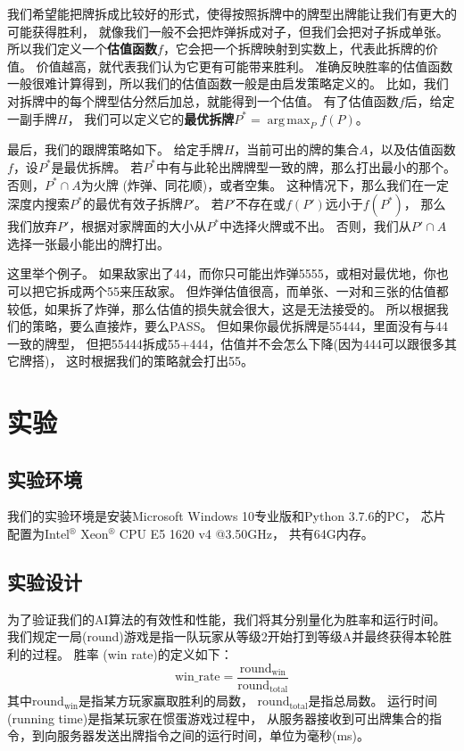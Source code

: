 \documentclass[a4paper]{ctexart}
\DeclareMathOperator*{\argmax}{arg\,max}
\begin{document}
\begin{enumerate}
\begin{enumerate}
    我们希望能把牌拆成比较好的形式，使得按照拆牌中的牌型出牌能让我们有更大的可能获得胜利，
    就像我们一般不会把炸弹拆成对子，但我们会把对子拆成单张。
    所以我们定义一个\textbf{估值函数}$f$，它会把一个拆牌映射到实数上，代表此拆牌的价值。
    价值越高，就代表我们认为它更有可能带来胜利。
    准确反映胜率的估值函数一般很难计算得到，所以我们的估值函数一般是由启发策略定义的。
    比如，我们对拆牌中的每个牌型估分然后加总，就能得到一个估值。
    有了估值函数$f$后，给定一副手牌$H$，
    我们可以定义它的\textbf{最优拆牌}$P^*=\argmax_{P} f(P)$。
    
    最后，我们的跟牌策略如下。
    给定手牌$H$，当前可出的牌的集合$A$，以及估值函数$f$，设$P^*$是最优拆牌。
    若$P^*$中有与此轮出牌牌型一致的牌，那么打出最小的那个。
    否则，$P^*\cap A$为火牌 (炸弹、同花顺)，或者空集。
    这种情况下，那么我们在一定深度内搜索$P^*$的最优有效子拆牌$P'$。
    若$P'$不存在或$f(P')$远小于$f(P^*)$，
    那么我们放弃$P'$，根据对家牌面的大小从$P^*$中选择火牌或不出。
    否则，我们从$P'\cap A$选择一张最小能出的牌打出。
    
    这里举个例子。
    如果敌家出了44，而你只可能出炸弹5555，或相对最优地，你也可以把它拆成两个55来压敌家。
    但炸弹估值很高，而单张、一对和三张的估值都较低，如果拆了炸弹，那么估值的损失就会很大，这是无法接受的。
    所以根据我们的策略，要么直接炸，要么PASS。
    但如果你最优拆牌是55444，里面没有与44一致的牌型，
    但把55444拆成55+444，估值并不会怎么下降(因为444可以跟很多其它牌搭)，
    这时根据我们的策略就会打出55。
    
  \end{enumerate}
\end{enumerate}

\section{实验} \label{sec:experiment}

\subsection{实验环境}

我们的实验环境是安装Microsoft Windows 10专业版和Python 3.7.6的PC，
芯片配置为Intel$^\circledR$ Xeon$^\circledR$  CPU E5 1620 v4 @3.50GHz，
共有64G内存。

\subsection{实验设计}

为了验证我们的AI算法的有效性和性能，我们将其分别量化为胜率和运行时间。
我们规定一局(round)游戏是指一队玩家从等级2开始打到等级A并最终获得本轮胜利的过程。
胜率 (win rate)的定义如下：
\[\mathrm{win\_rate} = \frac{\mathrm{round}_{\mathrm{win}}}{\mathrm{round}_{\mathrm{total}}}\]
其中$\mathrm{round}_{\mathrm{win}}$是指某方玩家赢取胜利的局数，
$\mathrm{round}_{\mathrm{total}}$是指总局数。
运行时间(running time)是指某玩家在惯蛋游戏过程中，
从服务器接收到可出牌集合的指令，到向服务器发送出牌指令之间的运行时间，单位为毫秒(ms)。
\end{document}
